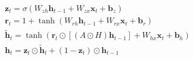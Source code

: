 \begin{gather*}
	\mathbf{z}_t = \sigma(W_{zh} \mathbf{h}_{t-1} + W_{zx} \mathbf{x}_t + \mathbf{b}_z)\\
	\mathbf{r}_t = 1 + \tanh(W_{rh} \mathbf{h}_{t-1} + W_{rx} \mathbf{x}_t + \mathbf{b}_r)\\
	\mathbf{\tilde{h}}_t = \tanh(\mathbf{r}_t \odot [(A \odot H) \mathbf{h}_{t-1}] + W_{hx} \mathbf{x}_t + \mathbf{b}_h)\\
	\mathbf{h}_t = \mathbf{z}_t \odot \mathbf{\tilde{h}}_t + (1 - \mathbf{z}_t) \odot \mathbf{h}_{t-1}
\end{gather*}